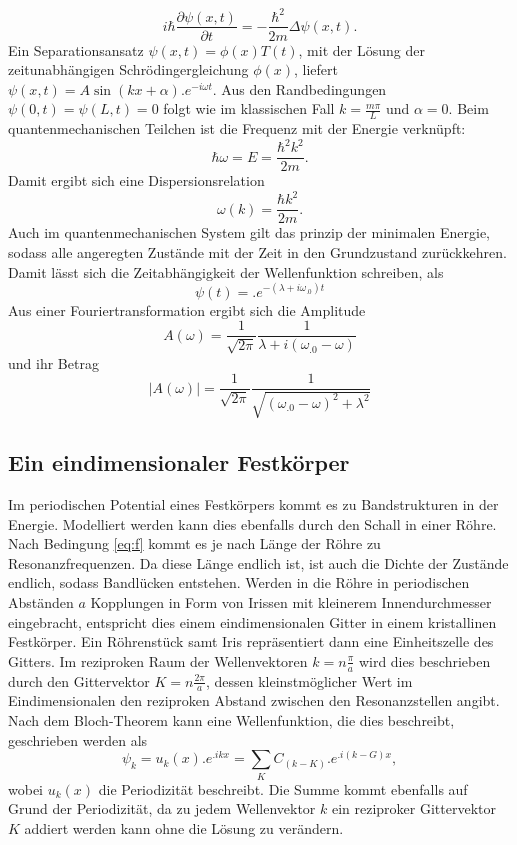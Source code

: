 \[
i\hbar\frac{\partial\psi(x,t)}{\partial t}=-\frac{\hbar^2}{2m}\Delta\psi(x,t)\text{.}
\]
Ein Separationsansatz $\psi(x,t)=\phi(x)T(t)$, mit der Lösung der zeitunabhängigen Schrödingergleichung $\phi(x)$, liefert
$\psi(x,t)=A\sin(kx+\alpha) .e^{-i\omega t}$. Aus den Randbedingungen 
$\psi(0,t)=\psi(L,t)=0$ folgt wie im klassischen Fall $k=\frac{m\pi}{L}$ und $\alpha=0$.
Beim quantenmechanischen Teilchen ist die Frequenz mit der Energie verknüpft:
\[
\hbar\omega=E=\frac{\hbar^2k^2}{2m}\text{.}
\]
Damit ergibt sich eine Dispersionsrelation
\begin{equation}
\omega(k)=\frac{\hbar k^2}{2m}\text{.}\label{eq:w_q}
\end{equation}
Auch im quantenmechanischen System gilt das prinzip der minimalen Energie, sodass alle angeregten Zustände mit der Zeit in den Grundzustand zurückkehren. Damit lässt sich die Zeitabhängigkeit der Wellenfunktion schreiben, als
\[
\psi(t)=.e^{-(\lambda+i\omega_.0)t}
\]
Aus einer Fouriertransformation ergibt sich die Amplitude
\[
A(\omega)=\frac{1}{\sqrt{2\pi}}\frac{1}{\lambda+i(\omega_.0-\omega)}
\]
und ihr Betrag
\begin{equation}
|A(\omega)|=\frac{1}{\sqrt{2\pi}}\frac{1}{\sqrt{(\omega_.0-\omega)^2+\lambda^2}}
\end{equation}

\subsection{Ein eindimensionaler Festkörper}

Im periodischen Potential eines Festkörpers kommt es zu Bandstrukturen in der Energie. Modelliert werden kann dies ebenfalls durch den Schall in einer Röhre. Nach Bedingung \eqref{eq:f} kommt es je nach Länge der Röhre zu Resonanzfrequenzen. Da diese Länge endlich ist, ist auch die Dichte der Zustände endlich, sodass Bandlücken entstehen. Werden in die Röhre in periodischen Abständen $a$ Kopplungen in Form von Irissen mit kleinerem Innendurchmesser eingebracht, entspricht dies einem eindimensionalen Gitter in einem kristallinen Festkörper. Ein Röhrenstück samt Iris repräsentiert dann eine Einheitszelle des Gitters. Im reziproken Raum der Wellenvektoren $k=n\frac{\pi}{a}$ wird dies beschrieben durch den Gittervektor $K=n\frac{2\pi}{a}$, dessen kleinstmöglicher Wert im Eindimensionalen den reziproken Abstand zwischen den Resonanzstellen angibt.
Nach dem Bloch-Theorem kann eine Wellenfunktion, die dies beschreibt, geschrieben werden als
\[
\psi_k=u_k(x) .e^{.i k x}=\sum_K C_{(k-K)} .e^{.i (k-G)x},
\]
wobei $u_k(x)$ die Periodizität beschreibt. Die Summe kommt ebenfalls auf Grund der Periodizität, da zu jedem Wellenvektor $k$ ein reziproker Gittervektor $K$ addiert werden kann ohne die Lösung zu verändern.

